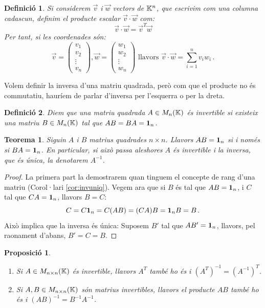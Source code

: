 \documentclass[
  11pt,
]{book}
\numberwithin{dummy}{section}
\theoremstyle{maincolornumbox}
\newtheorem{theorem}{TTTT}[chapter]
\newtheorem{theoremeT}{Teorema}[chapter]
\theoremstyle{blacknumex}
\theoremstyle{blacknumbox}
\newtheorem{definitionT}{Definició}[chapter]
\theoremstyle{maincolornum}
\newtheorem{propositionT}{Proposició}[chapter]
\renewenvironment{theorem}{\begin{tBox}\begin{theoremeT}}{\end{theoremeT}\end{tBox}}
\newenvironment{proposition}{\begin{pBox}\begin{propositionT}}{\end{propositionT}\end{pBox}}
\newenvironment{definition}{\begin{dBox}\begin{definitionT}}{\end{definitionT}\end{dBox}}
\begin{document}
\begin{definition}
Si considerem \(\vec{v}\) i \(\vec{w}\) vectors de \(\mathbb{K}^n\), que escrivim com
una columna cadascun, definim el \emph{producte escalar
\(\vec{v}\cdot\vec{w}\)} com: \[\vec{v}\cdot \vec{w}=\vec{v}^T \vec{w}\]
Per tant, si les coordenades són: \[\vec{v}=\begin{pmatrix}
    v_1 \\ v_2 \\ \vdots \\ v_n 
    \end{pmatrix}, 
    \vec{w}=\begin{pmatrix}
    w_1 \\ w_2 \\ \vdots \\ w_n 
    \end{pmatrix}
    \text{ llavors }
    \vec{v}\cdot\vec{w}=\sum_{i=1}^n v_iw_i \,.\]
\end{definition}

Volem definir la inversa d'una matriu quadrada, però com que el producte
no és commutatiu, hauríem de parlar d'inversa per l'esquerra o per la
dreta.

\begin{definition}
Diem que una \emph{matriu quadrada \(A \in M_{n}(\mathbb{K})\) és invertible} si
existeix una matriu \(B \in M_n(\mathbb{K})\) tal que \(AB=BA=\mathbf{1}_n\).\\

\end{definition}

\begin{theorem}
\protect\hypertarget{thm:invuniq}{}\label{thm:invuniq}Siguin \(A\) i \(B\) matrius quadrades
\(n\times n\). Llavors \(AB=\mathbf{1}_n\) si i només si \(BA=\mathbf{1}_n\). En particular,
si això passa aleshores \(A\) és invertible i la inversa, que és única, la
denotarem \(A^{-1}\).
\end{theorem}

\begin{proof}
La primera part la demostrarem quan tinguem el concepte de rang
d'una matriu (Corol·lari
\ref{cor:invuniq}). Vegem ara que si \(B\) és tal que \(AB=\mathbf{1}_n\), i
\(C\) tal que \(CA=\mathbf{1}_n\), llavors \(B=C\):
\[C = C \mathbf{1}_n = C(AB)=(CA)B=\mathbf{1}_n B=B \,.\] Això implica que la inversa és
única: Suposem \(B'\) tal que \(AB'=\mathbf{1}_n\), llavors, pel raonament d'abans,
\(B'=C=B\).
\end{proof}

\begin{proposition}
\leavevmode

\begin{enumerate}
\def\labelenumi{\arabic{enumi}.}
\item
  Si \(A \in M_{n\times n}(\mathbb{K})\) és invertible, llavors \(A^T\) també ho
  és i \((A^T)^{-1}=(A^{-1})^T\).
\item
  Si \(A,B \in M_{n\times n}(\mathbb{K})\) són matrius invertibles, llavors el
  producte \(AB\) també ho és i \((AB)^{-1}=B^{-1}A^{-1}\).
\end{enumerate}

\end{proposition}
\end{document}

